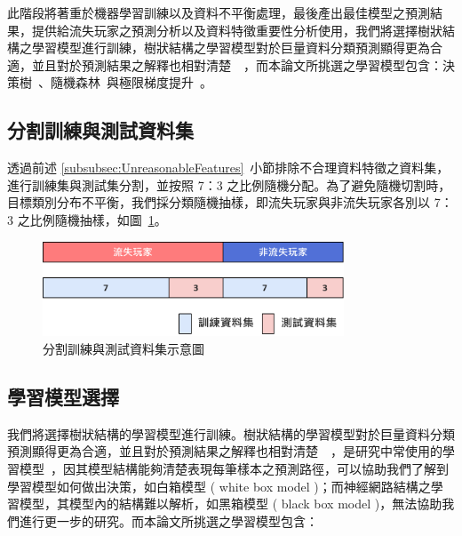 此階段將著重於機器學習訓練以及資料不平衡處理，最後產出最佳模型之預測結果，提供給流失玩家之預測分析以及資料特徵重要性分析使用，我們將選擇樹狀結構之學習模型進行訓練，樹狀結構之學習模型對於巨量資料分類預測顯得更為合適，並且對於預測結果之解釋也相對清楚~\cite{lee2018game}~\cite{sifa2015predicting}，而本論文所挑選之學習模型包含：決策樹~\cite{breiman1984classification}、隨機森林~\cite{breiman2001random}與極限梯度提升~\cite{chen2016xgboost}。

\subsection{分割訓練與測試資料集}
\label{subsec:SplitDataset}

透過前述 \ref{subsubsec:UnreasonableFeatures}~小節排除不合理資料特徵之資料集，進行訓練集與測試集分割，並按照 7：3 之比例隨機分配。為了避免隨機切割時，目標類別分布不平衡，我們採分類隨機抽樣，即流失玩家與非流失玩家各別以 7：3 之比例隨機抽樣，如圖~\ref{fig:Image_SplitDataset}。

\begin{figure}[!htb]
  \begin{center}
    \includegraphics[width=0.8\textwidth]{figures/Image_SplitDataset.png}
    \caption[分割訓練與測試資料集示意圖]{分割訓練與測試資料集示意圖}
    \label{fig:Image_SplitDataset}
  \end{center}
\end{figure}

\subsection{學習模型選擇}
\label{subsec:ModelSelection}

我們將選擇樹狀結構的學習模型進行訓練。樹狀結構的學習模型對於巨量資料分類預測顯得更為合適，並且對於預測結果之解釋也相對清楚~\cite{lee2018game}~\cite{sifa2015predicting}，是研究中常使用的學習模型~\cite{wu2008top}，因其模型結構能夠清楚表現每筆樣本之預測路徑，可以協助我們了解到學習模型如何做出決策，如白箱模型 ( white box model )；而神經網路結構之學習模型，其模型內的結構難以解析，如黑箱模型 ( black box model )，無法協助我們進行更一步的研究。而本論文所挑選之學習模型包含：

